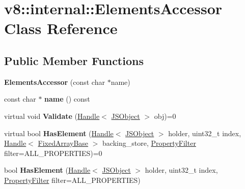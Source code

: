 \hypertarget{classv8_1_1internal_1_1_elements_accessor}{}\section{v8\+:\+:internal\+:\+:Elements\+Accessor Class Reference}
\label{classv8_1_1internal_1_1_elements_accessor}
\subsection*{Public Member Functions}
\begin{DoxyCompactItemize}
\item 
{\bfseries Elements\+Accessor} (const char $\ast$name)\hypertarget{classv8_1_1internal_1_1_elements_accessor_afd173d3eec2fdc84c886bce26c4066ab}{}\label{classv8_1_1internal_1_1_elements_accessor_afd173d3eec2fdc84c886bce26c4066ab}

\item 
const char $\ast$ {\bfseries name} () const \hypertarget{classv8_1_1internal_1_1_elements_accessor_ab475578277c9dbd4fb1ef558ab6203d8}{}\label{classv8_1_1internal_1_1_elements_accessor_ab475578277c9dbd4fb1ef558ab6203d8}

\item 
virtual void {\bfseries Validate} (\hyperlink{classv8_1_1internal_1_1_handle}{Handle}$<$ \hyperlink{classv8_1_1internal_1_1_j_s_object}{J\+S\+Object} $>$ obj)=0\hypertarget{classv8_1_1internal_1_1_elements_accessor_a67084696f2a29ae768cb2ac452ab0816}{}\label{classv8_1_1internal_1_1_elements_accessor_a67084696f2a29ae768cb2ac452ab0816}

\item 
virtual bool {\bfseries Has\+Element} (\hyperlink{classv8_1_1internal_1_1_handle}{Handle}$<$ \hyperlink{classv8_1_1internal_1_1_j_s_object}{J\+S\+Object} $>$ holder, uint32\+\_\+t index, \hyperlink{classv8_1_1internal_1_1_handle}{Handle}$<$ \hyperlink{classv8_1_1internal_1_1_fixed_array_base}{Fixed\+Array\+Base} $>$ backing\+\_\+store, \hyperlink{namespacev8_afbf02b6b1152a3e25d7bde90798209ac}{Property\+Filter} filter=A\+L\+L\+\_\+\+P\+R\+O\+P\+E\+R\+T\+I\+ES)=0\hypertarget{classv8_1_1internal_1_1_elements_accessor_aa708f1bbab56239b012858bdbf61edfe}{}\label{classv8_1_1internal_1_1_elements_accessor_aa708f1bbab56239b012858bdbf61edfe}

\item 
bool {\bfseries Has\+Element} (\hyperlink{classv8_1_1internal_1_1_handle}{Handle}$<$ \hyperlink{classv8_1_1internal_1_1_j_s_object}{J\+S\+Object} $>$ holder, uint32\+\_\+t index, \hyperlink{namespacev8_afbf02b6b1152a3e25d7bde90798209ac}{Property\+Filter} filter=A\+L\+L\+\_\+\+P\+R\+O\+P\+E\+R\+T\+I\+ES)\hypertarget{classv8_1_1internal_1_1_elements_accessor_a9d6e554f7844f4ac9245f54507759a9a}{}\label{classv8_1_1internal_1_1_elements_accessor_a9d6e554f7844f4ac9245f54507759a9a}


\end{DoxyCompactItemize}
